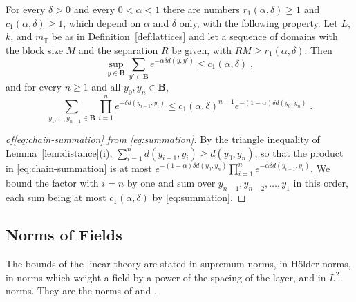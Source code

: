 \documentclass[11pt]{preprint}
\numberwithin{equation}{section}
\begin{document}
\begin{lemma}\label{lem:summation}
For every $\delta > 0$ and every $0 < \alpha < 1$ there are numbers $r_1(\alpha, \delta) \geqslant 1$ and $c_1(\alpha, \delta) \geqslant 1$, which depend on $\alpha$ and $\delta$ only, with the following property. Let $L$, $k$, and $m_{\mathbb T}$ be as in Definition~\ref{def:lattices} and let a sequence of domains with the block size $M$ and the separation $R$ be given, with $RM \geqslant r_1(\alpha, \delta)$. Then
\begin{equation}\label{eq:summation}
    \sup_{y \in \mathbf B}\sum_{y' \in \mathbf B}e^{-\alpha\delta d(y, y')} \leqslant c_1(\alpha, \delta)\;,
\end{equation}
and for every $n \geqslant 1$ and all $y_0, y_n \in \mathbf B$,
\begin{equation}\label{eq:chain-summation}
    \sum_{y_1, \dots, y_{n-1} \in \mathbf B}\prod_{i=1}^{n}e^{-\delta d(y_{i-1}, y_i)} \leqslant c_1(\alpha, \delta)^{n-1}e^{-(1 - \alpha)\delta d(y_0, y_n)}\;.
\end{equation}
\end{lemma}

\begin{proof}[of\eqref{eq:chain-summation} from \eqref{eq:summation}]
By the triangle inequality of Lemma~\ref{lem:distance}(i), $\sum_{i=1}^{n}d(y_{i-1}, y_i) \geqslant d(y_0, y_n)$, so that the product in \eqref{eq:chain-summation} is at most $e^{-(1 - \alpha)\delta d(y_0, y_n)}\prod_{i=1}^{n}e^{-\alpha\delta d(y_{i-1}, y_i)}$. We bound the factor with $i = n$ by one and sum over $y_{n-1}, y_{n-2}, \dots, y_1$ in this order, each sum being at most $c_1(\alpha, \delta)$ by \eqref{eq:summation}.
\end{proof}

\subsection{Norms of Fields}\label{sec:norms}

The bounds of the linear theory are stated in supremum norms, in H\"older norms, in norms which weight a field by a power of the spacing of the layer, and in $L^2$-norms. They are the norms of \cite[(1.108), (1.109), p.~35]{BalabanPRT1} and \cite[(3.39)--(3.41), p.~397]{BalabanPBG}.
\end{document}
